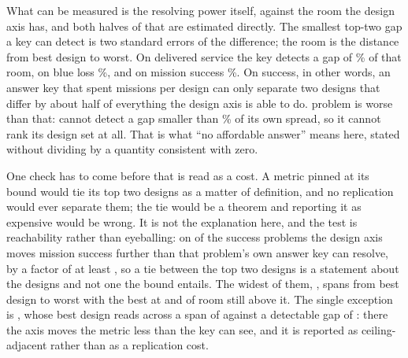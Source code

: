 \documentclass[11pt]{article}
\begin{document}
What can be measured is the resolving power itself, against the room the design axis has, and both
halves of that are estimated directly. The smallest top-two gap a key can detect is two standard
errors of the difference; the room is the distance from best design to worst. On delivered service
the key detects a gap of \BnKeyDetSrv{}\% of that room, on blue loss \BnKeyDetLoss{}\%, and on
mission success \BnKeyDetSucc{}\%. On success, in other words, an answer key that spent
\BnRepsSucc{} missions per design can only separate two designs that differ by about half of
everything the design axis is able to do. \BnKeyUnrankable{} problem is worse than that:
\BnKeyDetWorstSuccKey{} cannot detect a gap smaller than \BnKeyDetWorstSucc{}\% of its own spread,
so it cannot rank its design set at all. That is what ``no affordable answer'' means here, stated
without dividing by a quantity consistent with zero.

One check has to come before that is read as a cost. A metric pinned at its bound would tie its top
two designs as a matter of definition, and no replication would ever separate them; the tie would be
a theorem and reporting it as expensive would be wrong. It is not the explanation here, and the test is reachability rather
than eyeballing: on \BnBoundMoves{} of the \BnBoundNSucc{} success problems the design axis moves
mission success further than that problem's own answer key can resolve, by a factor of at least
\BnBoundMovesMin{}, so a tie between the top two designs is a statement about the designs and not
one the bound entails. The widest of them, \BnBoundWideKey{}, spans \BnBoundWideSpan{} from best
design to worst with the best at \BnBoundWideBest{} and \BnBoundWideHead{} of room still above it.
The single exception is \BnBoundCeilKey{}, whose best design reads \BnBoundCeilBest{} across a span
of \BnBoundCeilSpan{} against a detectable gap of \BnBoundCeilDet{}: there the axis moves the metric
less than the key can see, and it is reported as ceiling-adjacent rather than as a replication cost.
\end{document}
